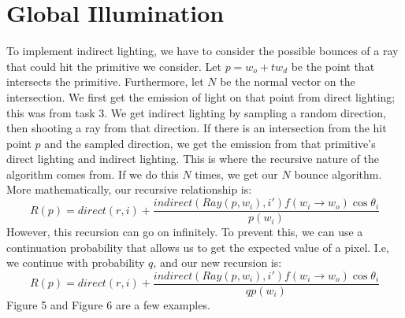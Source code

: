 \documentclass{article}
\begin{document}
\section{Global Illumination}
To implement indirect lighting, we have to consider the possible bounces of a ray that could hit the primitive we consider. Let $p = w_o + tw_d$ be the point that intersects the primitive. Furthermore, let $N$ be the normal vector on the intersection. We first get the emission of light on that point from direct lighting; this was from task 3. We get indirect lighting by sampling a random direction, then shooting a ray from that direction. If there is an intersection from the hit point $p$ and the sampled direction, we get the emission from that primitive's direct lighting and indirect lighting. This is where the recursive nature of the algorithm comes from. If we do this $N$ times, we get our $N$ bounce algorithm. More mathematically, our recursive relationship is:
$$R(p) = direct(r, i) + \frac{indirect(Ray(p, w_i), i')f(w_i \to w_o)\cos\theta_i}{p(w_i)} $$
However, this recursion can go on infinitely. To prevent this, we can use a continuation probability that allows us to get the expected value of a pixel. I.e, we continue with probability $q$, and our new recursion is:
$$R(p) = direct(r, i) + \frac{indirect(Ray(p, w_i), i')f(w_i \to w_o)\cos\theta_i}{qp(w_i)} $$
Figure 5 and Figure 6 are a few examples.
\end{document}
